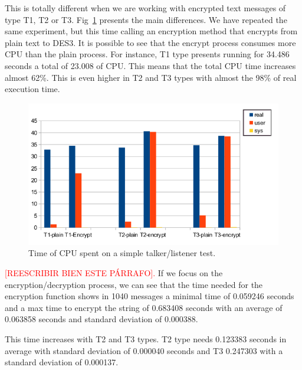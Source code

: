 \documentclass[journal,twoside]{JoPhA}
\begin{document}
This is totally different when we are working with encrypted text messages of type T1, T2 or T3. Fig~\ref{fig:time_text_CPU} presents the main differences. We have repeated the same experiment, but this time calling an encryption method that encrypts from plain text to DES3. It is possible to see that the encrypt process consumes more CPU than  the plain process.
For instance, T1 type presents running for  34.486 seconds a total of 23.008 of CPU. This means that the total CPU time increases almost 62\%. This is even higher in T2 and T3 types with almost the 98\% of real execution time.
\begin{figure}[ht!]
    \centering
    \includegraphics[width=.5\textwidth]{Tiempos_CPU_cifrado_texto.png}
    \caption{Time of CPU spent on a simple talker/listener test.}
  \label{fig:time_text_CPU}
\end{figure}

{\textcolor{red}{[REESCRIBIR BIEN ESTE P\'ARRAFO].}} If we focus on the encryption/decryption process, we can see that the time needed for the encryption function shows in 1040 messages a minimal time of 0.059246 seconds and a max time to encrypt the string of 0.683408 seconds with an average of 0.063858 seconds and standard deviation of 0.000388.

This time increases with T2 and T3 types. T2 type needs 0.123383 seconds in average with standard deviation of 0.000040 seconds and  T3  0.247303 with a standard deviation of 0.000137.



\end{document}
